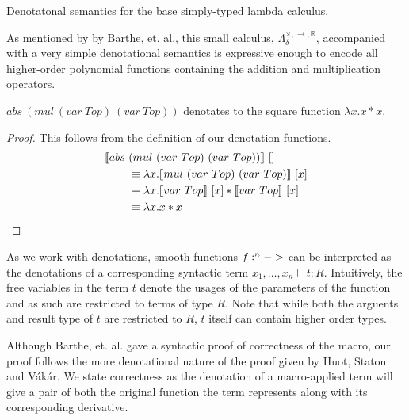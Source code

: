 \documentclass[11pt, final]{article}
\makeatletter
\def\Vakar{V\'{a}k\'{a}r}
\def\lambdaBase{\Lambda_{\delta}^{\times, \rightarrow, \mathds{R}}}
\def\<#1>{\csname keyword@@#1\endcsname}
\makeatother
\begin{document}
  \begin{listing}
    \begin{verbatim}
    \end{verbatim}
    \caption{Denotatonal semantics for the base simply-typed lambda calculus.}
    \label{lst:denotation_base}
  \end{listing}

  As mentioned by by Barthe, et. al.\cite{barthe2020versatility}, this small calculus, $\lambdaBase$, accompanied with a very simple denotational semantics is expressive enough to encode all higher-order polynomial functions containing the addition and multiplication operators.

  \begin{example}[Square]
    $abs\ (mul\ (var\ Top)\ (var\ Top))$ denotates to the square function $\lambda x. x * x$.
    \begin{proof}
      This follows from the definition of our denotation functions.
      \begin{align*}
        \llbracket abs\ &(mul\ (var\ Top)\ (var\ Top)) \rrbracket\ [] \\
          &\equiv \lambda x.
            \llbracket mul\ (var\ Top)\ (var\ Top) \rrbracket\ [x] \\
          &\equiv \lambda x.
            \llbracket var\ Top \rrbracket\ [x] *
              \llbracket var\ Top \rrbracket\ [x] \\
          &\equiv \lambda x. x * x \qedhere
      \end{align*}
    \end{proof}
  \end{example}


  As we work with denotations, smooth functions $f : \<R>^n -> \<R>$ can be interpreted as the denotations of a corresponding syntactic term $x_1, \dots, x_n \vdash t : R$.
  Intuitively, the free variables in the term $t$ denote the usages of the parameters of the function and as such are restricted to terms of type $R$.
  Note that while both the arguents and result type of $t$ are restricted to $R$, $t$ itself can contain higher order types.

  Although Barthe, et. al.\cite{barthe2020versatility} gave a syntactic proof of correctness of the macro, our proof follows the more denotational nature of the proof given by Huot, Staton and \Vakar{}\cite{huot2020correctness}.
  We state correctness as the denotation of a macro-applied term will give a pair of both the original function the term represents along with its corresponding derivative.
\end{document}
